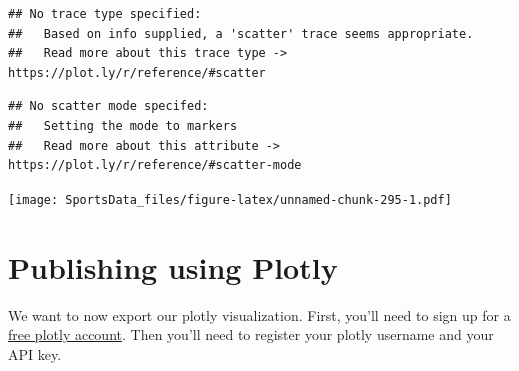 \documentclass[
]{book}
\newenvironment{Shaded}{\begin{snugshade}}{\end{snugshade}}
\newcommand{\DataTypeTok}[1]{\textcolor[rgb]{0.13,0.29,0.53}{#1}}
\newcommand{\KeywordTok}[1]{\textcolor[rgb]{0.13,0.29,0.53}{\textbf{#1}}}
\newcommand{\NormalTok}[1]{#1}
\newcommand{\OperatorTok}[1]{\textcolor[rgb]{0.81,0.36,0.00}{\textbf{#1}}}
\newcommand{\StringTok}[1]{\textcolor[rgb]{0.31,0.60,0.02}{#1}}
\begin{document}
\begin{Shaded}
\end{Shaded}

\begin{verbatim}
## No trace type specified:
##   Based on info supplied, a 'scatter' trace seems appropriate.
##   Read more about this trace type -> https://plot.ly/r/reference/#scatter
\end{verbatim}

\begin{verbatim}
## No scatter mode specifed:
##   Setting the mode to markers
##   Read more about this attribute -> https://plot.ly/r/reference/#scatter-mode
\end{verbatim}

\texttt{[image: SportsData\_files/figure-latex/unnamed-chunk-295-1.pdf]}

\hypertarget{publishing-using-plotly}{%
\section{Publishing using Plotly}\label{publishing-using-plotly}}

We want to now export our plotly visualization. First, you'll need to sign up for a \href{https://chart-studio.plotly.com/Auth/login/\#/}{free plotly account}. Then you'll need to register your plotly username and your API key.
\end{document}
